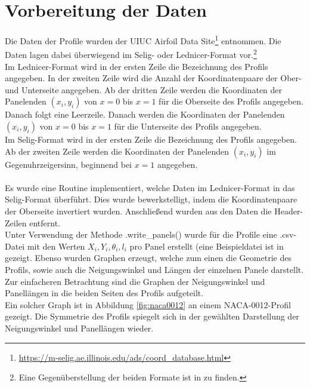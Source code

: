 \section{Vorbereitung der Daten}
Die Daten der Profile wurden der UIUC Airfoil Data Site\footnote{\url{https://m-selig.ae.illinois.edu/ads/coord_database.html}} entnommen. Die Daten lagen dabei überwiegend im Selig- oder Lednicer-Format vor.\footnote{Eine Gegenüberstellung der beiden Formate ist in  zu finden.}
\\
Im Lednicer-Format wird in der ersten Zeile die Bezeichnung des Profils angegeben. In der zweiten Zeile wird die Anzahl der Koordinatenpaare der Ober- und Unterseite angegeben. Ab der dritten Zeile werden die Koordinaten der Panelenden $(x_i,y_i)$ von $x=0$ bis $x=1$ für die Oberseite des Profils angegeben. Danach folgt eine Leerzeile. Danach werden die Koordinaten der Panelenden $(x_i,y_i)$ von $x=0$ bis $x=1$ für die Unterseite des Profils angegeben.
\\
Im Selig-Format wird in der ersten Zeile die Bezeichnung des Profils angegeben. Ab der zweiten Zeile werden die Koordinaten der Panelenden $(x_i,y_i)$ im Gegenuhrzeigersinn, beginnend bei $x=1$ angegeben.
\\\\
Es wurde eine Routine implementiert, welche Daten im Lednicer-Format in das Selig-Format überführt. Dies wurde bewerkstelligt, indem die Koordinatenpaare der Oberseite invertiert wurden. Anschließend wurden aus den Daten die Header-Zeilen entfernt. \\
Unter Verwendung der Methode .write\_panels() wurde für die Profile eine .csv-Datei mit den Werten $X_i, Y_i, \theta _i, l_i$ pro Panel erstellt (eine Beispieldatei ist in  gezeigt. Ebenso wurden Graphen erzeugt, welche zum einen die Geometrie des Profils, sowie auch die Neigungswinkel und Längen der einzelnen Panele darstellt. Zur einfacheren Betrachtung sind die Graphen der Neigungswinkel und Panellängen in die beiden Seiten des Profils aufgeteilt. 
\\Ein solcher Graph ist in Abbildung \ref{fig:naca0012} an einem NACA-0012-Profil gezeigt. Die Symmetrie des Profils spiegelt sich in der gewählten Darstellung der Neigungswinkel und Panellängen wieder.

